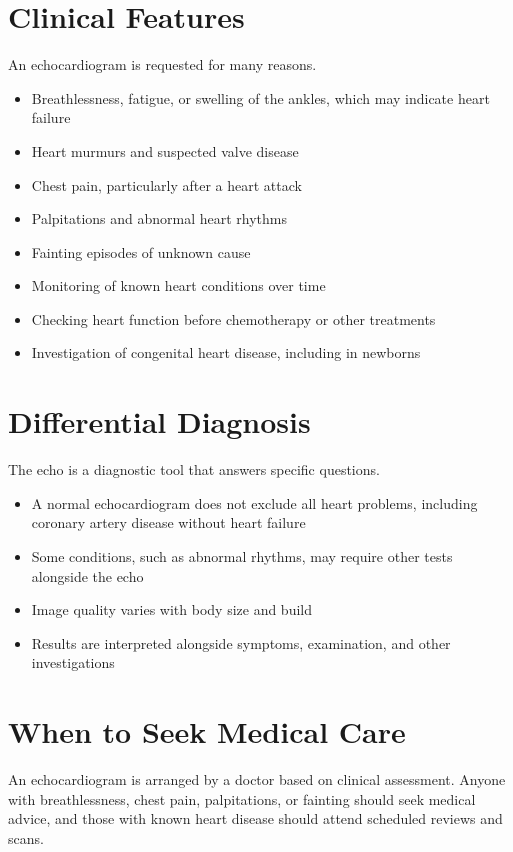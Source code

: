 \section*{Clinical Features}
An echocardiogram is requested for many reasons.
\begin{itemize}
    \item Breathlessness, fatigue, or swelling of the ankles, which may indicate heart failure
    \item Heart murmurs and suspected valve disease
    \item Chest pain, particularly after a heart attack
    \item Palpitations and abnormal heart rhythms
    \item Fainting episodes of unknown cause
    \item Monitoring of known heart conditions over time
    \item Checking heart function before chemotherapy or other treatments
    \item Investigation of congenital heart disease, including in newborns
\end{itemize}

\section*{Differential Diagnosis}
The echo is a diagnostic tool that answers specific questions.
\begin{itemize}
    \item A normal echocardiogram does not exclude all heart problems, including coronary artery disease without heart failure
    \item Some conditions, such as abnormal rhythms, may require other tests alongside the echo
    \item Image quality varies with body size and build
    \item Results are interpreted alongside symptoms, examination, and other investigations
\end{itemize}

\section*{When to Seek Medical Care}
An echocardiogram is arranged by a doctor based on clinical assessment. Anyone with breathlessness, chest pain, palpitations, or fainting should seek medical advice, and those with known heart disease should attend scheduled reviews and scans.

